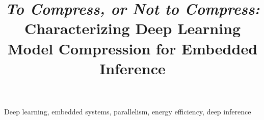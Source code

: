 \documentclass[10pt,conference]{IEEEtran}
\begin{document}
\title{\LARGE \emph{To Compress, or Not to Compress:} Characterizing Deep Learning Model Compression for Embedded Inference}

\author{
%
\vspace{-30mm}
 }

\maketitle




\begin{IEEEkeywords}
Deep learning, embedded systems, parallelism, energy efficiency, deep inference
\end{IEEEkeywords}











\balance
\end{document}
